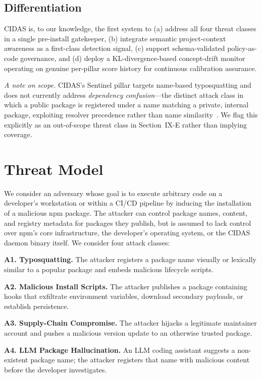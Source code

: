 \documentclass[journal]{IEEEtran}
\begin{document}
\subsection{Differentiation}
CIDAS is, to our knowledge, the first system to (a) address all four threat classes in a single pre-install
gatekeeper, (b) integrate semantic project-context awareness as a first-class detection signal, (c) support
schema-validated policy-as-code governance, and (d) deploy a KL-divergence-based concept-drift monitor
operating on genuine per-pillar score history for continuous calibration assurance.

\emph{A note on scope.} CIDAS's Sentinel pillar targets name-based typosquatting and does not currently
address \emph{dependency confusion}---the distinct attack class in which a public package is registered
under a name matching a private, internal package, exploiting resolver precedence rather than name
similarity~\cite{birsan2021}. We flag this explicitly as an out-of-scope threat class in Section~IX-E rather
than implying coverage.

\section{Threat Model}
We consider an adversary whose goal is to execute arbitrary code on a developer's workstation or within a
CI/CD pipeline by inducing the installation of a malicious npm package. The attacker can control package
names, content, and registry metadata for packages they publish, but is assumed to lack control over npm's
core infrastructure, the developer's operating system, or the CIDAS daemon binary itself. We consider four
attack classes:

\textbf{A1. Typosquatting.} The attacker registers a package name visually or lexically similar to a popular
package and embeds malicious lifecycle scripts.

\textbf{A2. Malicious Install Scripts.} The attacker publishes a package containing hooks that exfiltrate
environment variables, download secondary payloads, or establish persistence.

\textbf{A3. Supply-Chain Compromise.} The attacker hijacks a legitimate maintainer account and pushes a
malicious version update to an otherwise trusted package.

\textbf{A4. LLM Package Hallucination.} An LLM coding assistant suggests a non-existent package name; the
attacker registers that name with malicious content before the developer investigates.
\end{document}
